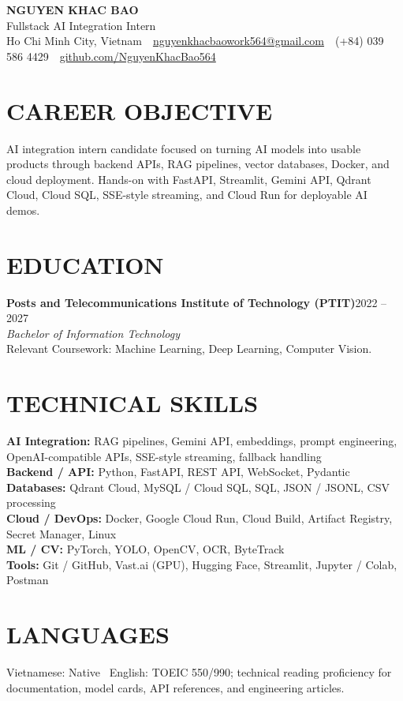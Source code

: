 \documentclass[10pt,a4paper]{article}
\newcommand{\entryhead}[2]{%
    \noindent\textbf{#1}\hfill #2\\[-2pt]
}
\newcommand{\entrysub}[1]{%
    \noindent\textit{#1}\\[-1pt]
}
\begin{document}
\fontsize{9.0}{9.9}\selectfont

\begin{center}
    {\Large\textbf{NGUYEN KHAC BAO}}\\[-1pt]
    Fullstack AI Integration Intern\\[2pt]
    Ho Chi Minh City, Vietnam
    \,\textbar\,
    \href{mailto:nguyenkhacbaowork564@gmail.com}{nguyenkhacbaowork564@gmail.com}
    \,\textbar\,
    (+84) 039 586 4429
    \,\textbar\,
    \href{https://github.com/NguyenKhacBao564}{github.com/NguyenKhacBao564}
\end{center}

\section{CAREER OBJECTIVE}
AI integration intern candidate focused on turning AI models into usable products through backend APIs, RAG pipelines, vector databases, Docker, and cloud deployment. Hands-on with FastAPI, Streamlit, Gemini API, Qdrant Cloud, Cloud SQL, SSE-style streaming, and Cloud Run for deployable AI demos.

\section{EDUCATION}
\entryhead{Posts and Telecommunications Institute of Technology (PTIT)}{2022 -- 2027}
\entrysub{Bachelor of Information Technology}
Relevant Coursework: Machine Learning, Deep Learning, Computer Vision.

\section{TECHNICAL SKILLS}
\textbf{AI Integration:} RAG pipelines, Gemini API, embeddings, prompt engineering, OpenAI-compatible APIs, SSE-style streaming, fallback handling\\
\textbf{Backend / API:} Python, FastAPI, REST API, WebSocket, Pydantic\\
\textbf{Databases:} Qdrant Cloud, MySQL / Cloud SQL, SQL, JSON / JSONL, CSV processing\\
\textbf{Cloud / DevOps:} Docker, Google Cloud Run, Cloud Build, Artifact Registry, Secret Manager, Linux\\
\textbf{ML / CV:} PyTorch, YOLO, OpenCV, OCR, ByteTrack\\
\textbf{Tools:} Git / GitHub, Vast.ai (GPU), Hugging Face, Streamlit, Jupyter / Colab, Postman

\section{LANGUAGES}
Vietnamese: Native \textbar\ English: TOEIC 550/990; technical reading proficiency for documentation, model cards, API references, and engineering articles.
\end{document}
